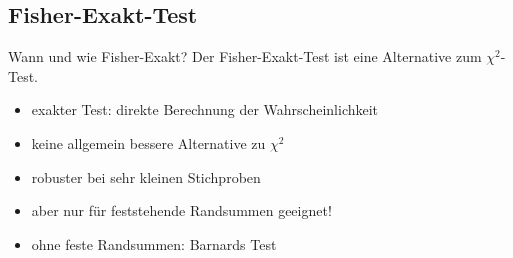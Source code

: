   \subsection[Fisher-Exakt]{Fisher-Exakt-Test}

\begin{frame}
  {Wann und wie Fisher-Exakt?}
  \alert{Der Fisher-Exakt-Test ist eine Alternative zum $\chi^2$-Test.}\\[3ex]

  \begin{itemize}[<+->]
    \item exakter Test: direkte Berechnung der Wahrscheinlichkeit
    \item \alert{keine} allgemein bessere Alternative zu $\chi^2$
    \item robuster bei sehr kleinen Stichproben
    \item \alert{aber nur für feststehende Randsummen geeignet!}
    \item ohne feste Randsummen: \alert{Barnards Test}
  \end{itemize}
  \vspace{0.5cm}
  
\end{frame}

